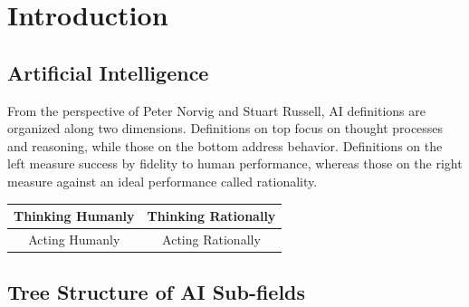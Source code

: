 \chapter{Introduction}

\section{Artificial Intelligence}



From the perspective of Peter Norvig and Stuart Russell, AI definitions are organized along two dimensions. Definitions on top focus on thought processes and reasoning, while those on the bottom address behavior. Definitions on the left measure success by fidelity to human performance, whereas those on the right measure against an ideal performance called rationality.

\begin{center}
   \begin{tabular}{c|c}
      Thinking Humanly & Thinking Rationally \\\hline
      Acting Humanly & Acting Rationally
   \end{tabular}
\end{center}


\section{Tree Structure of AI Sub-fields}

